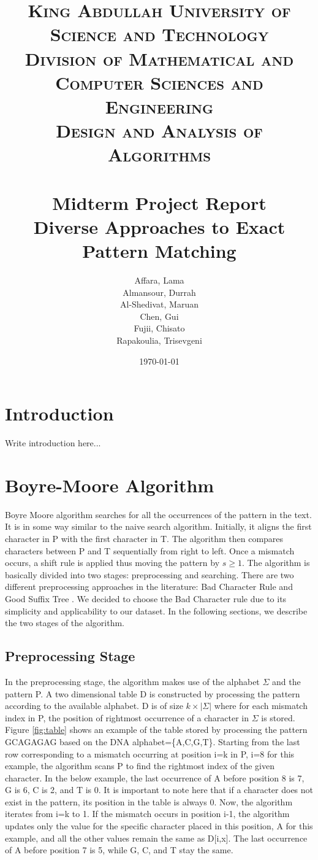\documentclass[paper=a4, fontsize=11pt]{scrartcl} %
\title{
\normalfont \normalsize
\textsc{King Abdullah University of Science and Technology\\
        Division of Mathematical and Computer Sciences and Engineering\\
        Design and Analysis of Algorithms} \\ [25pt] %
\horrule{0.5pt} \\[0.4cm] %
\Large Midterm Project Report\\
\huge Diverse Approaches to Exact Pattern Matching
\horrule{2pt} \\[0.5cm] %
}
\author{Affara, Lama\\
        Almansour, Durrah\\
        Al-Shedivat, Maruan\\
        Chen, Gui\\
        Fujii, Chisato\\
        Rapakoulia, Trisevgeni}
\date{\normalsize\today} %
\numberwithin{equation}{section} %
\numberwithin{figure}{section} %
\numberwithin{table}{section} %
\begin{document}
\begin{titlepage}
\maketitle
\thispagestyle{empty}
\clearpage
\end{titlepage}


\section{Introduction}
Write introduction here...

\section{Boyre-Moore Algorithm}
Boyre Moore algorithm \cite{bm_fast} searches for all the occurrences of the pattern in the text. It is in some way similar to the naive search algorithm. Initially, it aligns the first character in P with the first character in T. The algorithm then compares characters between P and T sequentially from right to left. Once a mismatch occurs, a shift rule is applied thus moving the pattern by $s\ge 1$. The algorithm is basically divided into two stages: preprocessing and searching. There are two different preprocessing approaches in the literature: Bad Character Rule and Good Suffix Tree \cite{bm_tbc}. We decided to choose the Bad Character rule due to its simplicity and applicability to our dataset. In the following sections, we describe the two stages of the algorithm.

\subsection{Preprocessing Stage}
In the preprocessing stage, the algorithm makes use of the alphabet $\Sigma$ and the pattern P. A two dimensional table D is constructed by processing the pattern according to the available alphabet. D is of size $k\times|\Sigma|$ where for each mismatch index in P, the position of rightmost occurrence of a character in $\Sigma$ is stored. Figure \ref{fig:table} shows an example of the table stored by processing the pattern GCAGAGAG based on the DNA alphabet=\{A,C,G,T\}. Starting from the last row corresponding to a mismatch occurring at position i=k in P, i=8 for this example, the algorithm scans P to find the rightmost index of the given character. In the below example, the last occurrence of A before position 8 is 7, G is 6, C is 2, and T is 0. It is important to note here that if a character does not exist in the pattern, its position in the table is always 0. Now, the algorithm iterates from i=k to 1. If the mismatch occurs in position i-1, the algorithm updates only the value for the specific character placed in this position, A for this example, and all the other values remain the same as D[i,x]. The last occurrence of A before position 7 is 5, while G, C, and T stay the same.
\end{document}

